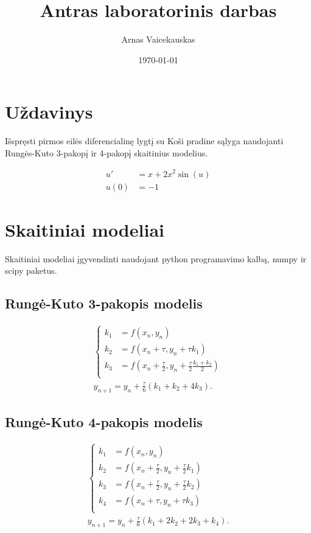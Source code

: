 \documentclass[11pt]{article}
\title{ Antras laboratorinis darbas}
\author{ Arnas Vaicekauskas }
\date{\today}
\begin{document}
\maketitle

\section{Uždavinys}

Išspręsti pirmos eilės diferencialinę lygtį su Koši pradine sąlyga naudojanti Rungės-Kuto 3-pakopį ir 4-pakopį skaitinius modelius.

\begin{align}
u'&=x+2x^2\sin(u)\\
u(0)&=-1
\end{align}

\section{Skaitiniai modeliai}

Skaitiniai modeliai įgyvendinti naudojant python programavimo kalbą, numpy ir scipy paketus.

\subsection{Rungė-Kuto 3-pakopis modelis}

\begin{align}
    \begin{cases}
        k_1&=f(x_n,y_n)\\
        k_2&=f(x_n+\tau,y_n+\tau k_1)\\
        k_3&=f(x_n+\frac{\tau}{2},y_n+\frac{\tau}{2}\frac{k_1+k_2}{2})\\
    \end{cases}\\
    y_{n+1}=y_n+\frac{\tau}{6}(k_1+k_2+4k_3).
\end{align}

\subsection{Rungė-Kuto 4-pakopis modelis}

\begin{align}
    \begin{cases}
        k_1&=f(x_n,y_n)\\
        k_2&=f(x_n+\frac{\tau}{2},y_n+\frac{\tau}{2}k_1)\\
        k_3&=f(x_n+\frac{\tau}{2},y_n+\frac{\tau}{2}k_2)\\
        k_4&=f(x_n+\tau,y_n+\tau k_3)\\
    \end{cases}\\
    y_{n+1}=y_n+\frac{\tau}{6}(k_1+2k_2+2k_3+k_4).
\end{align}
\end{document}
